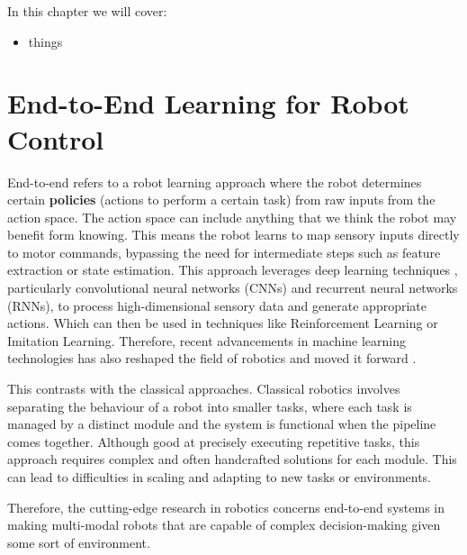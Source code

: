 In this chapter we will cover:
\begin{itemize}
\item things
\end{itemize}

\section{End-to-End Learning for Robot Control}

  End-to-end refers to a robot learning approach where the robot determines certain \textbf{policies} (actions to perform a certain task) from raw inputs from the action space. The action space can include anything that we think the robot may benefit form knowing. This means the 
  robot learns to map sensory inputs directly to motor commands, bypassing the need for intermediate steps such as feature extraction or state estimation. This approach leverages deep learning techniques \cite{Schmidhuber2015nn}, particularly convolutional neural networks (CNNs) and recurrent neural networks (RNNs), to process high-dimensional sensory data and generate appropriate actions. Which can then be used in techniques like Reinforcement Learning  or Imitation Learning.  Therefore, recent advancements in machine learning technologies has also reshaped the field of robotics and moved it forward \cite{Pierson18082017,newbury2023graspSynthReview,liu2021DRLminireview}.


  This contrasts with the classical approaches. Classical robotics involves separating the behaviour of a robot into smaller tasks, where each task is managed by a distinct module and the system is functional when the pipeline comes together. Although good at precisely executing repetitive tasks, this approach requires complex and often handcrafted solutions for each module. This can lead to difficulties in scaling and adapting to new tasks or environments. 
  
  Therefore, the cutting-edge research in robotics concerns end-to-end systems in making multi-modal robots  that are capable of complex decision-making given some sort of environment.




